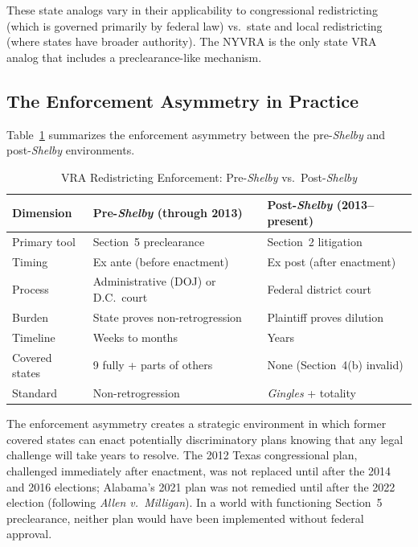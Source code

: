 These state analogs vary in their applicability to congressional redistricting
(which is governed primarily by federal law) vs.\ state and local redistricting
(where states have broader authority). The NYVRA is the only state VRA analog
that includes a preclearance-like mechanism.

\subsection{The Enforcement Asymmetry in Practice}

Table~\ref{tab:enforcement} summarizes the enforcement asymmetry between
the pre-\textit{Shelby} and post-\textit{Shelby} environments.

\begin{table}[ht]
\centering
\caption{VRA Redistricting Enforcement: Pre-\textit{Shelby} vs.\ Post-\textit{Shelby}}
\label{tab:enforcement}
\begin{tabular}{lll}
\toprule
Dimension & Pre-\textit{Shelby} (through 2013) & Post-\textit{Shelby} (2013--present) \\
\midrule
Primary tool & Section~5 preclearance & Section~2 litigation \\
Timing & Ex ante (before enactment) & Ex post (after enactment) \\
Process & Administrative (DOJ) or D.C.\ court & Federal district court \\
Burden & State proves non-retrogression & Plaintiff proves dilution \\
Timeline & Weeks to months & Years \\
Covered states & 9 fully + parts of others & None (Section~4(b) invalid) \\
Standard & Non-retrogression & \textit{Gingles} + totality \\
\bottomrule
\end{tabular}
\end{table}

The enforcement asymmetry creates a strategic environment in which former
covered states can enact potentially discriminatory plans knowing that
any legal challenge will take years to resolve. The 2012 Texas congressional
plan, challenged immediately after enactment, was not replaced until after
the 2014 and 2016 elections; Alabama's 2021 plan was not remedied until
after the 2022 election (following \textit{Allen v.\ Milligan}). In a
world with functioning Section~5 preclearance, neither plan would have
been implemented without federal approval.
